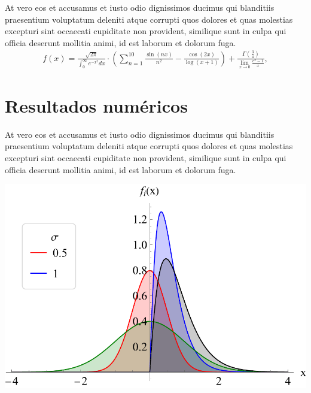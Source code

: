 \documentclass[a0,portrait]{a0poster}
\begin{document}
\begin{mdframed}[style=MyFrame]
\begin{multicols}{2}
At vero eos et accusamus et iusto odio dignissimos ducimus qui blanditiis praesentium voluptatum deleniti atque corrupti quos dolores et quas molestias excepturi sint occaecati cupiditate non provident, similique sunt in culpa qui officia deserunt mollitia animi, id est laborum et dolorum fuga.
%
\begin{equation}\label{eqn:L}
\begin{split}
	f(x) = \frac{\sqrt{2 \pi}}{\int_{0}^{\infty} e^{-x^2} dx} \cdot \left(\sum_{n=1}^{10} \frac{\sin(nx)}{n^2} - \frac{\cos(2x)}{\log(x+1)}\right) + \frac{\Gamma\left(\frac{3}{4}\right)}{\lim_{{x \to 0}} \frac{e^x - 1}{x}},
\end{split}
\end{equation}

\section{Resultados numéricos}\label{section4}

At vero eos et accusamus et iusto odio dignissimos ducimus qui blanditiis praesentium voluptatum deleniti atque corrupti quos dolores et quas molestias excepturi sint occaecati cupiditate non provident, similique sunt in culpa qui officia deserunt mollitia animi, id est laborum et dolorum fuga.
%
\vspace{1cm}
\begin{minipage}{\columnwidth}
    \includegraphics[width=0.9\columnwidth]{figures/f}
\end{minipage}
\vspace{1cm} %


\end{multicols}
\end{mdframed}
\end{document}

